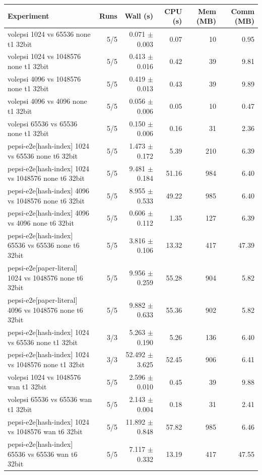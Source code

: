 \begin{tabular}{lrrrrr}
\toprule
Experiment & Runs & Wall (s) & CPU (s) & Mem (MB) & Comm (MB) \\
\midrule
volepsi 1024 vs 65536 none t1 32bit & 5/5 & 0.071 $\pm$ 0.003 & 0.07 & 10 & 0.95 \\
volepsi 1024 vs 1048576 none t1 32bit & 5/5 & 0.413 $\pm$ 0.016 & 0.42 & 39 & 9.81 \\
volepsi 4096 vs 1048576 none t1 32bit & 5/5 & 0.419 $\pm$ 0.013 & 0.43 & 39 & 9.89 \\
volepsi 4096 vs 4096 none t1 32bit & 5/5 & 0.056 $\pm$ 0.006 & 0.05 & 10 & 0.47 \\
volepsi 65536 vs 65536 none t1 32bit & 5/5 & 0.150 $\pm$ 0.006 & 0.16 & 31 & 2.36 \\
pepsi-e2e[hash-index] 1024 vs 65536 none t6 32bit & 5/5 & 1.473 $\pm$ 0.172 & 5.39 & 210 & 6.39 \\
pepsi-e2e[hash-index] 1024 vs 1048576 none t6 32bit & 5/5 & 9.481 $\pm$ 0.184 & 51.16 & 984 & 6.40 \\
pepsi-e2e[hash-index] 4096 vs 1048576 none t6 32bit & 5/5 & 8.955 $\pm$ 0.533 & 49.22 & 985 & 6.40 \\
pepsi-e2e[hash-index] 4096 vs 4096 none t6 32bit & 5/5 & 0.606 $\pm$ 0.112 & 1.35 & 127 & 6.39 \\
pepsi-e2e[hash-index] 65536 vs 65536 none t6 32bit & 5/5 & 3.816 $\pm$ 0.106 & 13.32 & 417 & 47.39 \\
pepsi-e2e[paper-literal] 1024 vs 1048576 none t6 32bit & 5/5 & 9.956 $\pm$ 0.259 & 55.28 & 904 & 5.82 \\
pepsi-e2e[paper-literal] 4096 vs 1048576 none t6 32bit & 5/5 & 9.882 $\pm$ 0.633 & 55.36 & 902 & 5.82 \\
pepsi-e2e[hash-index] 1024 vs 65536 none t1 32bit & 3/3 & 5.263 $\pm$ 0.190 & 5.26 & 136 & 6.40 \\
pepsi-e2e[hash-index] 1024 vs 1048576 none t1 32bit & 3/3 & 52.492 $\pm$ 3.625 & 52.45 & 906 & 6.41 \\
volepsi 1024 vs 1048576 wan t1 32bit & 5/5 & 2.596 $\pm$ 0.010 & 0.45 & 39 & 9.88 \\
volepsi 65536 vs 65536 wan t1 32bit & 5/5 & 2.143 $\pm$ 0.004 & 0.18 & 31 & 2.41 \\
pepsi-e2e[hash-index] 1024 vs 1048576 wan t6 32bit & 5/5 & 11.892 $\pm$ 0.848 & 57.82 & 985 & 6.46 \\
pepsi-e2e[hash-index] 65536 vs 65536 wan t6 32bit & 5/5 & 7.117 $\pm$ 0.332 & 13.19 & 417 & 47.55 \\
\bottomrule
\end{tabular}
